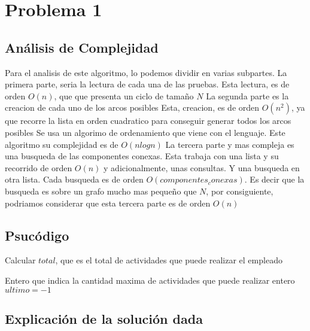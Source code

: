 \documentclass[a4paper,10pt]{article}
\title{}
\author{}
\date{}
\begin{document}
\maketitle
\section{Problema 1}
\subsection{Análisis de Complejidad}
  \hspace{2cm}Para el analisis de este algoritmo, lo podemos dividir  en varias subpartes.
  La primera parte, seria la lectura de cada una de las pruebas.
  Esta lectura, es de orden {$O(n)$}, que que presenta un ciclo de tamaño {$N$}
  La segunda parte es la creacion de cada uno de los arcos posibles
  Esta, creacion, es de orden {$O(n^2)$}, ya que recorre la lista 
  en orden cuadratico para conseguir generar todos los arcos posibles
  Se usa un algorimo de ordenamiento que viene con el lenguaje. Este algoritmo su complejidad es de {$O(nlogn)$}
  La tercera parte y mas compleja es una busqueda de las componentes conexas.
  Esta trabaja con una lista y su recorrido de orden {$O(n)$}
  y adicionalmente, unas consultas. Y una busqueda en otra lista.
  Cada busqueda es de orden {$O(componentes_conexas)$}. Es decir que la busqueda es sobre un 
  grafo mucho mas pequeño que {$N$}, por consiguiente, podriamos considerar que esta tercera 
  parte es de orden {$O(n)$}
\subsection{Psucódigo}
\begin{algorithm}                      %
\caption{Calcular $total$, que es el total de actividades que puede realizar el empleado}          %
\label{Problema 1}                           %
\begin{algorithmic}[1]                    %
    \ENSURE Entero que indica la cantidad maxima de actividades que puede realizar
    \STATE entero {$ultimo = -1$}
\end{algorithmic}
\end{algorithm}
\subsection{Explicación de la solución dada}
\end{document}

